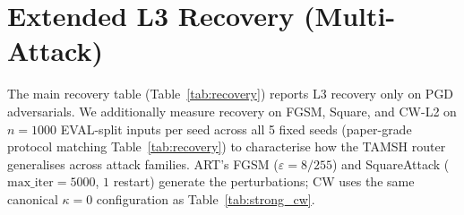 
\section{Extended L3 Recovery (Multi-Attack)}
\label{app:recovery_multi}

The main recovery table (Table~\ref{tab:recovery}) reports L3 recovery
only on PGD adversarials. We additionally measure recovery on FGSM,
Square, and CW-L2 on $n{=}1000$ EVAL-split inputs per seed across
all 5 fixed seeds (paper-grade protocol matching
Table~\ref{tab:recovery}) to characterise how the TAMSH router
generalises across attack families. ART's FGSM ($\varepsilon{=}8/255$)
and SquareAttack ($\text{max\_iter}{=}5000$, $1$ restart) generate the
perturbations; CW uses the same canonical $\kappa{=}0$ configuration
as Table~\ref{tab:strong_cw}.

